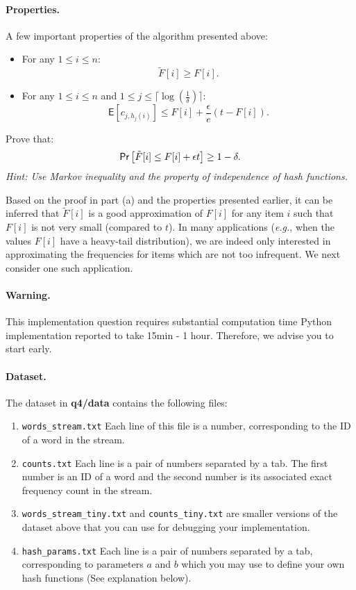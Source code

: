 \paragraph{Properties.} A few important properties of the algorithm presented above:
\begin{itemize}
\item For any $1\leq i\leq n$:
\[
	\tilde{F}[i]\geq F[i].
\]
\item For any $1\leq i\leq n$ and $1\leq j\leq \lceil \log(\frac{1}{\delta})\rceil$:
\[
	\mathsf{E}\left[c_{j,h_j(i)}\right] \leq F[i] + \frac{\epsilon}{e} (t - F[i]).
\]
\end{itemize}

 Prove that:
\[
	\mathsf{Pr}\left[\tilde{F}[i] \leq F[i] + \epsilon t\right] \geq 1-\delta.
\]
\emph{Hint: Use Markov inequality and the property of independence of hash functions.}

Based on the proof in part (a) and the properties presented earlier, it can be inferred that $\tilde{F}[i]$ is a good approximation of $F[i]$ for any item $i$ such that $F[i]$ is not very small (compared to $t$). In many applications (\emph{e.g.}, when the values $F[i]$ have a heavy-tail distribution), we are indeed only interested in approximating the frequencies for items which are not too infrequent. We next consider one such application.


\paragraph{Warning.} This implementation question requires substantial computation time %
Python implementation reported to take 15min - 1 hour. Therefore, we advise you to start early.

\paragraph{Dataset.} %
The dataset in \textbf{q4/data} contains the following files:
\begin{enumerate}
\item \texttt{words\_stream.txt} Each line of this file is a number, corresponding to the ID of a word in the stream.
\item \texttt{counts.txt} Each line is a pair of numbers separated by a tab. The first number is an ID of a word and the second number is its associated exact frequency count in the stream.
\item \texttt{words\_stream\_tiny.txt} and \texttt{counts\_tiny.txt} are smaller versions of the dataset above that you can use for debugging your implementation.
\item \texttt{hash\_params.txt} Each line is a pair of numbers separated by a tab, corresponding to parameters $a$ and $b$ which you may use to define your own hash functions (See explanation below).
\end{enumerate}

